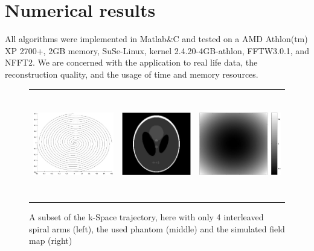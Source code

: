 \documentclass[journal]{IEEEtran}
\numberwithin{equation}{section}
\numberwithin{table}{section}
\numberwithin{figure}{section}
\begin{document}
\section{Numerical results}\label{Sec:Num}
All algorithms were implemented in Matlab\&C and tested on a AMD Athlon(tm) XP
2700+, 2GB memory, SuSe-Linux, kernel 2.4.20-4GB-athlon, FFTW3.0.1, and NFFT2.
We are concerned with the application to real life data, the reconstruction
quality, and the usage of time and memory resources.

\begin{figure}[ht] 
\centering
\begin{tabular}{ccc}
\includegraphics[height=4.7cm]{pics/spiral.jpg} &
\includegraphics[height=4.7cm]{pics/phantom_original.jpg} &
\includegraphics[height=4.7cm]{pics/fieldmap_simulated.jpg}
\end{tabular}
\caption{A subset of the k-Space trajectory, here with only 4 interleaved spiral arms (left), the used phantom (middle) and the simulated field map (right)}
\label{Fig:Phantom}
\end{figure}
\end{document}
